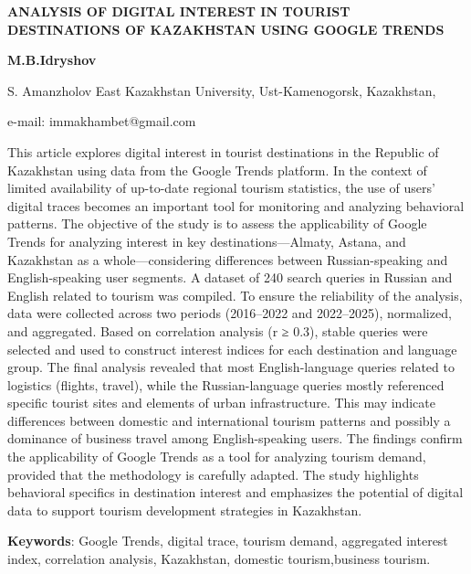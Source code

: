 \begin{articleheader}
{\bfseries ANALYSIS OF DIGITAL INTEREST IN TOURIST DESTINATIONS OF KAZAKHSTAN USING GOOGLE TRENDS}

{\bfseries M.B.Idryshov}
\end{articleheader}

\begin{affiliation}
S. Amanzholov East Kazakhstan University, Ust-Kamenogorsk, Kazakhstan,

e-mail: immakhambet@gmail.com
\end{affiliation}

This article explores digital interest in tourist destinations in the
Republic of Kazakhstan using data from the Google Trends platform. In
the context of limited availability of up-to-date regional tourism
statistics, the use of users' digital traces becomes an important tool
for monitoring and analyzing behavioral patterns. The objective of the
study is to assess the applicability of Google Trends for analyzing
interest in key destinations---Almaty, Astana, and Kazakhstan as a
whole---considering differences between Russian-speaking and
English-speaking user segments. A dataset of 240 search queries in
Russian and English related to tourism was compiled. To ensure the
reliability of the analysis, data were collected across two periods
(2016--2022 and 2022--2025), normalized, and aggregated. Based on
correlation analysis (r ≥ 0.3), stable queries were selected and used to
construct interest indices for each destination and language group. The
final analysis revealed that most English-language queries related to
logistics (flights, travel), while the Russian-language queries mostly
referenced specific tourist sites and elements of urban infrastructure.
This may indicate differences between domestic and international tourism
patterns and possibly a dominance of business travel among
English-speaking users. The findings confirm the applicability of Google
Trends as a tool for analyzing tourism demand, provided that the
methodology is carefully adapted. The study highlights behavioral
specifics in destination interest and emphasizes the potential of
digital data to support tourism development strategies in Kazakhstan.

{\bfseries Keywords}: Google Trends, digital trace, tourism demand,
aggregated interest index, correlation analysis, Kazakhstan, domestic
tourism,business tourism.

